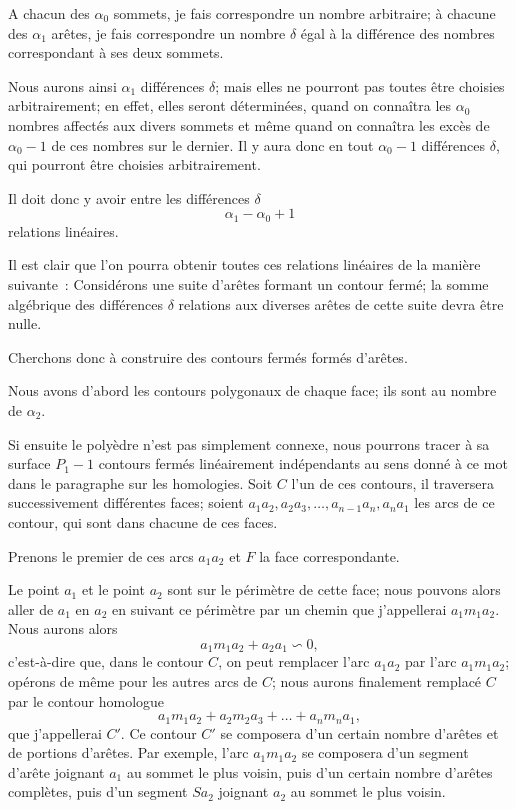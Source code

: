 \documentclass{article}
\begin{document}
A chacun des $\alpha_{0}$ sommets, je fais correspondre un nombre arbitraire; à chacune des $\alpha_{1}$ arêtes, je fais correspondre un nombre $\delta$ égal à la différence des nombres correspondant à ses deux sommets.

Nous aurons ainsi $\alpha_{1}$ différences $\delta$; mais elles ne pourront pas toutes être choisies arbitrairement; en effet, elles seront déterminées, quand on connaîtra les $\alpha_{0}$ nombres affectés aux divers sommets et même quand on connaîtra les excès de $\alpha_{0} - 1$ de ces nombres sur le dernier. Il y aura donc en tout $\alpha_{0} - 1$ différences $\delta$, qui pourront être choisies arbitrairement.

Il doit donc y avoir entre les différences $\delta$
\[ \alpha_{1} - \alpha_{0} + 1 \]
relations linéaires.

Il est clair que l'on pourra obtenir toutes ces relations linéaires de la manière suivante~: Considérons une suite d'arêtes formant un contour fermé; la somme algébrique des différences $\delta$ relations aux diverses arêtes de cette suite devra être nulle.

Cherchons donc à construire des contours fermés formés d'arêtes.

Nous avons d'abord les contours polygonaux de chaque face; ils sont au nombre de $\alpha_{2}$.

Si ensuite le polyèdre n'est pas simplement connexe, nous pourrons tracer à sa surface $P_{1} - 1$ contours fermés linéairement indépendants au sens donné à ce mot dans le paragraphe sur les homologies. Soit $C$ l'un de ces contours, il traversera successivement différentes faces; soient $a_{1}a_{2}, a_{2}a_{3}, \ldots, a_{n-1}a_{n}, a_{n}a_{1}$ les arcs de ce contour, qui sont dans chacune de ces faces.

Prenons le premier de ces arcs $a_{1}a_{2}$ et $F$ la face correspondante.

Le point $a_{1}$ et le point $a_{2}$ sont sur le périmètre de cette face; nous pouvons alors aller de $a_{1}$ en $a_{2}$ en suivant ce périmètre par un chemin que j'appellerai $a_{1}m_{1}a_{2}$. Nous aurons alors
\[ a_{1}m_{1}a_{2} + a_{2}a_{1} \backsim 0, \]
c'est-à-dire que, dans le contour $C$, on peut remplacer l'arc $a_{1}a_{2}$ par l'arc $a_{1}m_{1}a_{2}$; opérons de même pour les autres arcs de $C$; nous aurons finalement remplacé $C$ par le contour homologue
\[ a_{1}m_{1}a_{2} + a_{2}m_{2}a_{3} + \ldots + a_{n}m_{n}a_{1}, \]
que j'appellerai $C'$. Ce contour $C'$ se composera d'un certain nombre d'arêtes et de portions d'arêtes. Par exemple, l'arc $a_{1}m_{1}a_{2}$ se composera d'un segment d'arête joignant $a_{1}$ au sommet le plus voisin, puis d'un certain nombre d'arêtes complètes, puis d'un segment $Sa_{2}$ joignant $a_{2}$ au sommet le plus voisin.
\end{document}
